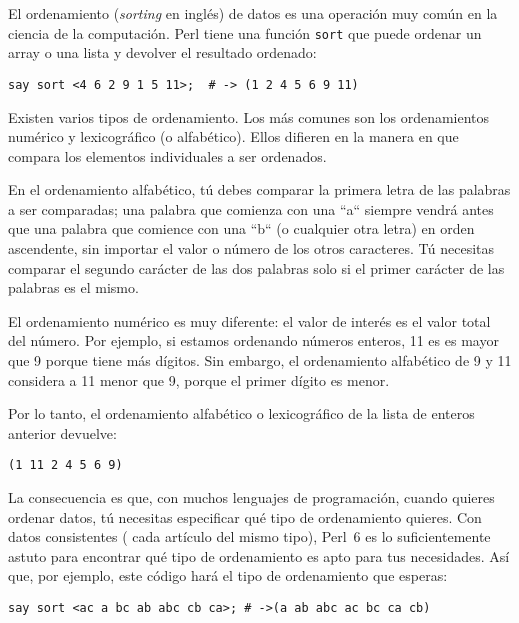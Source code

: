 El ordenamiento (\emph{sorting} en inglés) de datos es 
una operación muy común en la ciencia de la computación.
Perl tiene una función {\tt sort} que puede ordenar
un array o una lista y devolver el resultado ordenado:

\begin{lstlisting}
say sort <4 6 2 9 1 5 11>;  # -> (1 2 4 5 6 9 11)
\end{lstlisting}

Existen varios tipos de ordenamiento. Los más comunes
son los ordenamientos numérico y lexicográfico (o alfabético).
Ellos difieren en la manera en que compara los elementos
individuales a ser ordenados.

En el ordenamiento alfabético, tú debes comparar la primera
letra de las palabras a ser comparadas; una palabra 
que comienza con una ``a`` siempre vendrá antes que una palabra
que comience con una ``b`` (o cualquier otra letra) en
orden ascendente, sin importar el valor o número de los 
otros caracteres. Tú necesitas comparar el segundo carácter
de las dos palabras solo si el primer carácter de las palabras
es el mismo.

El ordenamiento numérico es muy diferente: el valor de
interés es el valor total del número. Por ejemplo, si estamos
ordenando números enteros, 11 es es mayor que 9 porque tiene 
más dígitos. Sin embargo, el ordenamiento alfabético de 9 y 11
considera a 11 menor que 9, porque el primer dígito es menor.

Por lo tanto, el ordenamiento alfabético o lexicográfico de la
lista de enteros anterior devuelve:

\begin{lstlisting}
(1 11 2 4 5 6 9)
\end{lstlisting}

La consecuencia es que, con muchos lenguajes de programación,
cuando quieres ordenar datos, tú necesitas especificar qué
tipo de ordenamiento quieres. Con datos consistentes (
cada artículo del mismo tipo), Perl~6 es lo suficientemente
astuto para encontrar qué tipo de ordenamiento es apto para
tus necesidades. Así que, por ejemplo, este código hará
el tipo de ordenamiento que esperas:

\begin{lstlisting}
say sort <ac a bc ab abc cb ca>; # ->(a ab abc ac bc ca cb)
\end{lstlisting}

